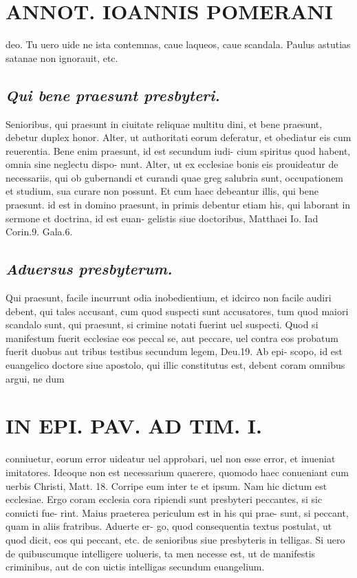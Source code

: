 \documentclass{article}
\begin{document}
\begin{pages}
\section*{ANNOT. IOANNIS POMERANI }\pstart deo. Tu uero uide ne ista contemnas, caue laqueos, caue scandala. Paulus astutias satanae non ignorauit, etc.  \pend
{}
{}
\subsection*{\textit{Qui bene praesunt presbyteri. }}\pstart Senioribus, qui praesunt in ciuitate reliquae multitu dini, et bene praesunt, debetur duplex honor. Alter, ut authoritati eorum deferatur, et obediatur eis cum reuerentia. Bene enim praesunt, id est secundum iudi- cium spiritus quod habent, omnia sine neglectu dispo- nunt. Alter, ut ex ecclesiae bonis eis prouideatur de necessariis, qui ob gubernandi et curandi quae greg salubria sunt, occupationem et studium, sua curare non possunt. Et cum haec debeantur illis, qui bene praesunt. id est in domino praesunt, in primis debentur etiam his, qui laborant in sermone et doctrina, id est euan- gelistis siue doctoribus, Matthaei Io. Iad Corin.9. Gala.6.  \pend
{}
{}
\subsection*{\textit{Aduersus presbyterum. }}\pstart Qui praesunt, facile incurrunt odia inobedientium, et idcirco non facile audiri debent, qui tales accusant, cum quod suspecti sunt accusatores, tum quod maiori scandalo sunt, qui praesunt, si crimine notati fuerint uel suspecti. Quod si manifestum fuerit ecclesiae eos peccal se, aut peccare, uel contra eos probatum fuerit duobus aut tribus testibus secundum legem, Deu.19. Ab epi- scopo, id est euangelico doctore siue apostolo, qui illic constitutus est, debent coram omnibus argui, ne dum  \pend
\section*{IN EPI. PAV. AD TIM. I. }
\marginpar{[ p.96 ]}\pstart conniuetur, eorum error uideatur uel approbari, uel non esse error, et inueniat imitatores. Ideoque non est necessarium quaerere, quomodo haec conueniant cum uerbis Christi, Matt. 18. Corripe eum inter te et ipsum. Nam hic dictum est ecclesiae. Ergo coram ecclesia cora ripiendi sunt presbyteri peccantes, si sic conuicti fue- rint. Maius praeterea periculum est in his qui prae- sunt, si peccant, quam in aliis fratribus. Aduerte er- go, quod consequentia textus postulat, ut quod dicit, eos qui peccant, etc. de senioribus siue presbyteris in telligas. Si uero de quibuscumque intelligere uolueris, ta men necesse est, ut de manifestis criminibus, aut de con uictis intelligas secundum euangelium.  \pend
{}
{}

\end{pages}
\end{document}
